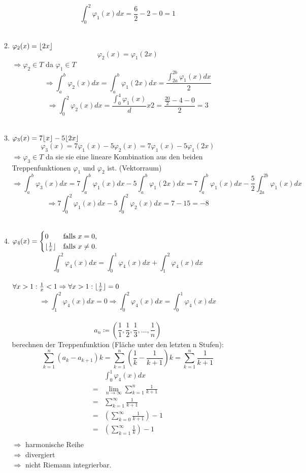 \documentclass{HM}
\begin{document}
\begin{enumerate}
\begin{enumerate}
\begin{align*}
				\end{align*}
				$$\int_0^2\varphi_1(x)dx=\frac{6}{2}-2-0=1$$\\
			\item $\varphi_2(x)=\lfloor2x\rfloor$
				$$\varphi_2(x)=\varphi_1(2x)$$
				$\Rightarrow \varphi_2\in T$ da $\varphi_1\in T$
				$$\Rightarrow \int_a^b\varphi_2(x)dx=\int_a^b\varphi_1(2x)dx=\frac{\int_{2a}^{2b}\varphi_1(x)dx}{2}$$
				$$\Rightarrow\int_0^2\varphi_2(x)dx=\frac{\int_0^4\varphi_1(x)}dx{2}=\frac{\frac{20}{2}-4-0}{2}=3$$\\
			\item $\varphi_3(x)=7\lfloor x\rfloor-5\lfloor2x\rfloor$
				$$\varphi_3(x)=7\varphi_1(x)-5\varphi_2(x)=7\varphi_1(x)-5\varphi_1(2x)$$
				$\Rightarrow \varphi_3\in T$ da sie sie eine lineare Kombination aus den beiden Treppenfunktionen $\varphi_1$ und $\varphi_2$ ist. (Vektorraum)
				$$\Rightarrow \int_a^b\varphi_3(x)dx=
				7\int_a^b\varphi_1(x)dx-5\int_a^b\varphi_1(2x)dx=
				7\int_a^b\varphi_1(x)dx-\frac{5}{2}\int_{2a}^{2b}\varphi_1(x)dx$$
				$$\Rightarrow 7\int_0^2\varphi_1(x)dx-5\int_0^2\varphi_2(x)dx=7-15=-8$$\\
			\item $\varphi_4(x)=\begin{cases}
				0&\text{falls }x=0,\\
				\lfloor\frac{1}{x}\rfloor&\text{falls }x\neq 0.
			\end{cases}$
			$$\int_0^2\varphi_4(x)dx=\int_0^1\varphi_4(x)dx+\int_1^2\varphi_4(x)dx$$\\
			$\forall x>1:\frac{1}{x}<1\Rightarrow\forall x>1:\lfloor\frac{1}{x}\rfloor=0$
			$$\Rightarrow\int_1^2\varphi_4(x)dx=0\Rightarrow\int_0^2\varphi_4(x)dx=\int_0^1\varphi_4(x)dx$$\\
			$$a_n\coloneqq\left(\frac{1}{1},\frac{1}{2},\frac{1}{3},\hdots,\frac{1}{n}\right)$$
			berechnen der Treppenfunktion (Fläche unter den letzten n Stufen): $$\sum_{k=1}^n(a_k-a_{k+1})k=\sum_{k=1}^n(\frac{1}{k}-\frac{1}{k+1})k=\sum_{k=1}^n\frac{1}{k+1}$$
			\begin{align*}
				&\int_0^1\varphi_4(x)dx\\
				=&\lim\limits_{n\to\infty}\sum_{k=1}^n\frac{1}{k+1}\\
				=&\sum\limits_{k=1}^\infty\frac{1}{k+1}\\
				=&\left(\sum\limits_{k=0}^\infty\frac{1}{k+1}\right)-1\\
				=&\left(\sum\limits_{k=1}^\infty\frac{1}{k}\right)-1\\
			\end{align*}
			$\Rightarrow$ harmonische Reihe\\
			$\Rightarrow$ divergiert\\
			$\Rightarrow$ nicht Riemann integrierbar.
		\end{enumerate}


\end{enumerate}
\end{document}
